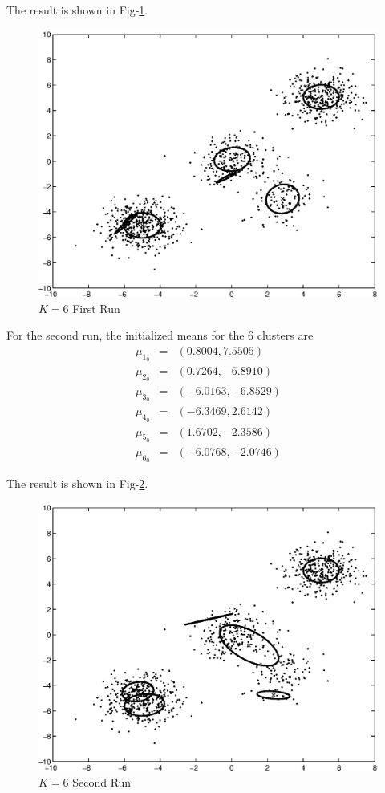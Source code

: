 \documentclass[12pt]{article}
\begin{document}
The result is shown in Fig-\ref{fig:c2-3}. \\

\begin{figure}[ht!]
  \centering
  \includegraphics[width=0.7 \textwidth]{c2-3}
  \caption{$K = 6$ First Run \label{fig:c2-3}}
\end{figure}

For the second run, the initialized means for the 6 clusters are
\begin{eqnarray*}
\mu_{1_0} &=& (0.8004,    7.5505) \\
\mu_{2_0} &=& (0.7264,   -6.8910) \\
\mu_{3_0} &=& (-6.0163,   -6.8529) \\
\mu_{4_0} &=& (-6.3469,    2.6142) \\
\mu_{5_0} &=& (1.6702,   -2.3586) \\
\mu_{6_0} &=& (-6.0768,   -2.0746)
\end{eqnarray*}

The result is shown in Fig-\ref{fig:c2-4}. \\

\begin{figure}[ht!]
  \centering
  \includegraphics[width=0.7 \textwidth]{c2-4}
  \caption{$K = 6$ Second Run \label{fig:c2-4}}
\end{figure}
\end{document}
